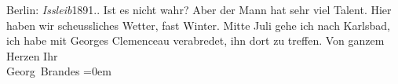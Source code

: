 \begin{ledgroupsized}[t]{13cm}
{{{                  Berlin: \emph{Issleib}1891.}}}\label{K_L01129-2h}. Ist es nicht wahr? Aber der Mann hat sehr viel Talent.\pend
           \pstart
           {\pb}Hier haben wir scheussliches
               Wetter, fast Winter. Mitte Juli gehe ich nach Karlsbad, ich habe mit Georges
                  Clemenceau verabredet, ihn dort zu treffen.\pend
           \pstart
           Von ganzem Herzen\pend
           \pstart
           Ihr{\\[\baselineskip]}\spacefill\mbox{Georg Brandes}\pend
           \leftskip=0em{}
         
         \endnumbering{}\end{ledgroupsized}  \newcommand{\dateiname}{L01129}\newcommand{\titel}{Georg Brandes an Arthur Schnitzler, 16. 6. 1901}\newcommand{\editorInnen}{Martin Anton Müller und Gerd-Hermann Susen}
      